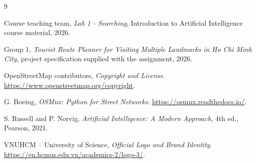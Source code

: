 \documentclass[12pt,a4paper]{article}
\begin{document}
\begin{thebibliography}{9}
\raggedright

Course teaching team,
\emph{Lab 1 - Searching}, Introduction to Artificial Intelligence course
material, 2026.

Group 1,
\emph{Tourist Route Planner for Visiting Multiple Landmarks in Ho Chi Minh
City}, project specification supplied with the assignment, 2026.

OpenStreetMap contributors,
\emph{Copyright and License}.
\url{https://www.openstreetmap.org/copyright}.

G. Boeing,
\emph{OSMnx: Python for Street Networks}.
\url{https://osmnx.readthedocs.io/}.

S. Russell and P. Norvig,
\emph{Artificial Intelligence: A Modern Approach}, 4th ed., Pearson, 2021.

VNUHCM -- University of Science,
\emph{Official Logo and Brand Identity}.
\url{https://en.hcmus.edu.vn/academics-2/logo-3/}.

\end{thebibliography}
\end{document}

